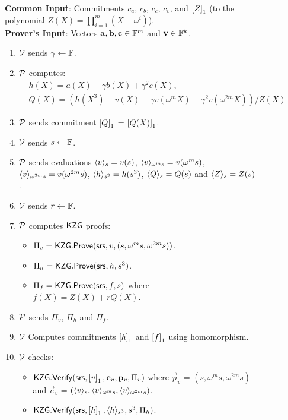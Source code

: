 \begin{figure}[htbp]
	\begin{mdframed}
		{
			{\bf Common Input}: Commitments $c_a$, $c_b$, $c_c$, $c_v$, and $\gone{Z}$ (to the polynomial
			$Z(X)=\prod_{i=1}^m (X-\omega^i)$). \\
			{\bf Prover's Input}: Vectors $\vec{a},\vec{b},\vec{c}\in\F^m$ and $\vec{v}\in \F^k$.
			\begin{enumerate}[leftmargin=1em, label=\arabic*.]
				\item $\verifier$ sends $\gamma\gets \F$.
				\item $\prover$ computes:
				\begin{align}
					& h(X) = a(X) + \gamma b(X) + \gamma^2 c(X),\\
					& Q(X) = (h(X^3) - v(X) - \gamma v(\omega^m X) - \gamma^2 v(\omega^{2m} X))/Z(X)
				\end{align}
				\item $\prover$ sends commitment $\gone{Q}$ = $\gone{Q(X)}$.
				\item $\verifier$ sends $s\gets\F$.
				\item $\prover$ sends evaluations $\val{s}{v}=v(s)$, $\val{\omega^m s}{v}=v(\omega^m s)$,
				$\val{\omega^{2m}s}{v}=v(\omega^{2m} s)$, $\val{s^3}{h}=h(s^3)$, $\val{s}{Q}=Q(s)$ and $\val{s}{Z}=Z(s)$.
				\item $\verifier$ sends $r\gets\F$.
				\item $\prover$ computes $\kzg$ proofs:
				\begin{itemize}[leftmargin=1em]
					\item $\Pi_v=\kzgprove(\srs,v,(s,\omega^m s, \omega^{2m}s))$.
					\item $\Pi_h=\kzgprove(\srs,h,s^3)$.
					\item $\Pi_f=\kzgprove(\srs,f,s)$ where $f(X)=Z(X) + rQ(X)$.
				\end{itemize}
				\item $\prover$ sends $\Pi_v$, $\Pi_h$ and $\Pi_f$.
				\item $\verifier$ Computes commitments $\gone{h}$ and $\gone{f}$ using homomorphism.
				\item $\verifier$ checks:
				\begin{itemize}[leftmargin=1em]
					\item $\kzgverify(\srs,\gone{v}, \vec{e}_v, \vec{p}_v, \Pi_v)$ where
					$\vec{p}_v$ = $(s,\omega^m s, \omega^{2m}s)$ and $\vec{e}_v$ = $(\val{s}{v}, \val{\omega^m s}{v}, \val{\omega^{2m} s}{v})$.
					\item $\kzgverify(\srs,\gone{h},  \val{s^3}{h}, s^3,\Pi_h)$.

\end{itemize}
\end{enumerate}}
\end{mdframed}
\end{figure}
